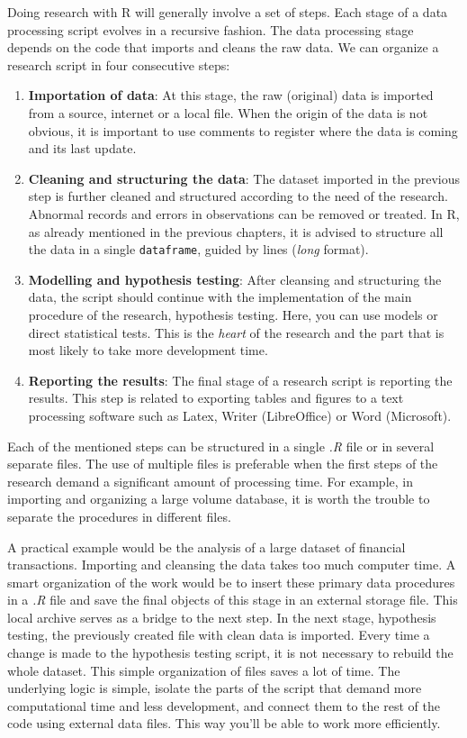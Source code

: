 \documentclass[11pt,]{book}
\begin{document}
Doing research with R will generally involve a set of steps. Each stage
of a data processing script evolves in a recursive fashion. The data
processing stage depends on the code that imports and cleans the raw
data. We can organize a research script in four consecutive steps:

\begin{enumerate}
\def\labelenumi{\arabic{enumi}.}
\item
  \textbf{Importation of data}: At this stage, the raw (original) data
  is imported from a source, internet or a local file. When the origin
  of the data is not obvious, it is important to use comments to
  register where the data is coming and its last update.
\item
  \textbf{Cleaning and structuring the data}: The dataset imported in
  the previous step is further cleaned and structured according to the
  need of the research. Abnormal records and errors in observations can
  be removed or treated. In R, as already mentioned in the previous
  chapters, it is advised to structure all the data in a single
  \texttt{dataframe}, guided by lines (\emph{long} format).
\item
  \textbf{Modelling and hypothesis testing}: After cleansing and
  structuring the data, the script should continue with the
  implementation of the main procedure of the research, hypothesis
  testing. Here, you can use models or direct statistical tests. This is
  the \emph{heart} of the research and the part that is most likely to
  take more development time.
\item
  \textbf{Reporting the results}: The final stage of a research script
  is reporting the results. This step is related to exporting tables and
  figures to a text processing software such as Latex, Writer
  (LibreOffice) or Word (Microsoft).
\end{enumerate}

Each of the mentioned steps can be structured in a single \emph{.R} file
or in several separate files. The use of multiple files is preferable
when the first steps of the research demand a significant amount of
processing time. For example, in importing and organizing a large volume
database, it is worth the trouble to separate the procedures in
different files.

A practical example would be the analysis of a large dataset of
financial transactions. Importing and cleansing the data takes too much
computer time. A smart organization of the work would be to insert these
primary data procedures in a \emph{.R} file and save the final objects
of this stage in an external storage file. This local archive serves as
a bridge to the next step. In the next stage, hypothesis testing, the
previously created file with clean data is imported. Every time a change
is made to the hypothesis testing script, it is not necessary to rebuild
the whole dataset. This simple organization of files saves a lot of
time. The underlying logic is simple, isolate the parts of the script
that demand more computational time and less development, and connect
them to the rest of the code using external data files. This way you'll
be able to work more efficiently.
\end{document}
